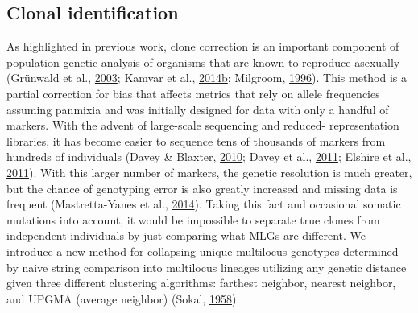 \documentclass[double,11pt]{beavtex}
\begin{document}
  \subsection{Clonal identification}\label{clonal-identification}
  
  As highlighted in previous work, clone correction is an important
  component of population genetic analysis of organisms that are known to
  reproduce asexually (Grünwald et al.,
  \protect\hyperlink{ref-grunwald2003analysis}{2003}; Kamvar et al.,
  \protect\hyperlink{ref-kamvar2014poppr}{2014}\protect\hyperlink{ref-kamvar2014poppr}{b};
  Milgroom, \protect\hyperlink{ref-milgroom1996recombination}{1996}). This
  method is a partial correction for bias that affects metrics that rely
  on allele frequencies assuming panmixia and was initially designed for
  data with only a handful of markers. With the advent of large-scale
  sequencing and reduced- representation libraries, it has become easier
  to sequence tens of thousands of markers from hundreds of individuals
  (Davey \& Blaxter, \protect\hyperlink{ref-davey2010rad}{2010}; Davey et
  al., \protect\hyperlink{ref-davey2011genome}{2011}; Elshire et al.,
  \protect\hyperlink{ref-elshire2011robust}{2011}). With this larger
  number of markers, the genetic resolution is much greater, but the
  chance of genotyping error is also greatly increased and missing data is
  frequent (Mastretta-Yanes et al.,
  \protect\hyperlink{ref-mastretta2015restriction}{2014}). Taking this
  fact and occasional somatic mutations into account, it would be
  impossible to separate true clones from independent individuals by just
  comparing what MLGs are different. We introduce a new method for
  collapsing unique multilocus genotypes determined by naive string
  comparison into multilocus lineages utilizing any genetic distance given
  three different clustering algorithms: farthest neighbor, nearest
  neighbor, and UPGMA (average neighbor) (Sokal,
  \protect\hyperlink{ref-sokal1958statistical}{1958}).
  
\end{document}
